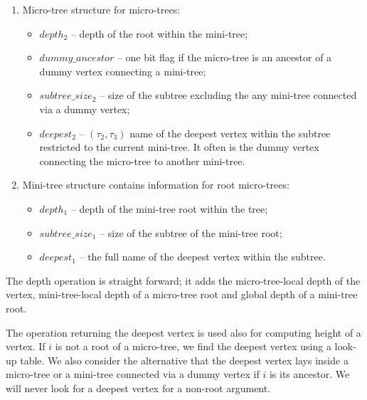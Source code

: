 \begin{enumerate}
	\item Micro-tree structure for micro-trees:
	\begin{itemize}
		\item $depth_2$ -- depth of the root within the mini-tree;
		\item $dummy\_ancestor$ -- one bit flag if the micro-tree is an ancestor of a dummy vertex connecting a mini-tree;
		\item $subtree\_size_2$ -- size of the subtree excluding the any mini-tree connected via a dummy vertex;
		\item $deepest_2$ -- $(\tau_2, \tau_3)$ name of the deepest vertex within the subtree restricted to the current mini-tree.
		It often is the dummy vertex connecting the micro-tree to another mini-tree.
	\end{itemize}
	\item Mini-tree structure contains information for root micro-trees:
	\begin{itemize}
		\item $depth_1$ -- depth of the mini-tree root within the tree;
		\item $subtree\_size_1$ -- size of the subtree of the mini-tree root;
		\item $deepest_1$ -- the full name of the deepest vertex within the subtree.
	\end{itemize}
\end{enumerate}

The depth operation is straight forward; it adds the micro-tree-local depth of the vertex, mini-tree-local depth of a micro-tree root and global depth of a mini-tree root.

\begin{algorithmic}
		\State {}
		\State {}
	\Else
		\State {}
	\EndIf
\EndFunction
\end{algorithmic}

The operation returning the deepest vertex is used also for computing height of a vertex.
If $i$ is not a root of a micro-tree, we find the deepest vertex using a look-up table.
We also consider the alternative that the deepest vertex lays inside a micro-tree or a mini-tree connected via a dummy vertex if $i$ is its ancestor.
We will never look for a deepest vertex for a non-root argument.

